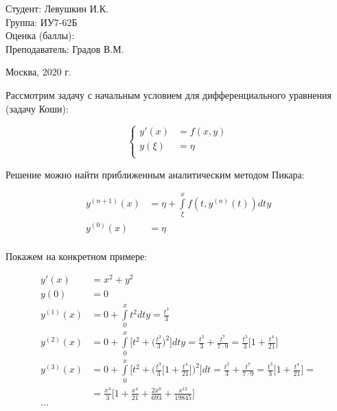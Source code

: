 \documentclass[a4paper,12pt]{article}
\begin{document}
\vspace*{20mm}

\large
\begin{flushleft}
	Студент: Левушкин И.К. \\
	Группа: ИУ7-62Б \\
	Оценка (баллы): \\
	Преподаватель: Градов В.М.
\end{flushleft}

\vspace*{50mm}

\large
\begin{center}
	Москва, 2020 г.
\end{center}

\thispagestyle{empty}

\newpage


Рассмотрим задачу с начальным условием для дифференциального
уравнения (задачу Коши):
	
\[
\left\{
\begin{aligned}
y'(x) &= f(x, y) \\
y(\xi) &= \eta \\
\end{aligned}
\right.
\]

Решение можно найти приближенным аналитическим методом Пикара:

\[
\begin{aligned}
y^{(n+1)}(x) &= \eta + \int\limits_{\xi}^x f(t, y^{(n)}(t)) dty \\
y^{(0)}(x) &= \eta \\
\end{aligned}
\]

Покажем на конкретном примере:

\[
\begin{aligned}
y'(x) &= x^2 + y^2 \\
y(0) &= 0 \\
y^{(1)}(x) &= 0 + \int\limits_{0}^x t^2 dty = \frac{t^3}{3} \\
y^{(2)}(x) &= 0 + \int\limits_{0}^x \bigg[t^2 + \bigg(\frac{t^3}{3}\bigg)^2\bigg] dty = 
\frac{t^3}{3} + \frac{t^7}{7 \cdot 9} =  \frac{t^3}{3} \bigg[1 + \frac{t^4}{21}\bigg]\\
y^{(3)}(x) &= 0 + \int\limits_{0}^x \bigg[t^2 + \bigg(
\frac{t^3}{3} \bigg[1 + \frac{t^4}{21}\bigg]\bigg)^2\bigg] dt = 
\frac{t^3}{3} + \frac{t^7}{7 \cdot 9} =  \frac{t^3}{3} \bigg[1 + \frac{t^4}{21}\bigg] =\\
&= \frac{x^3}{3} \bigg[1 + \frac{x^4}{21} +
\frac{2x^8}{693} + \frac{x^{12}}{19845}\bigg] \\
\dots
\end{aligned}
\]
\end{document}
